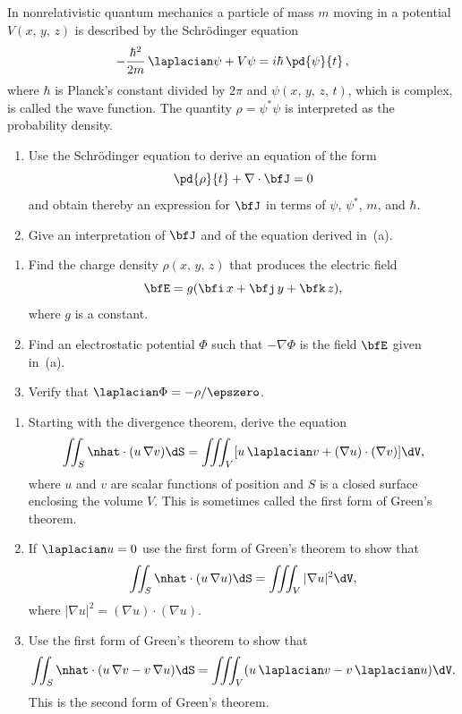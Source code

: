 \begin{problems}
\prob
In nonrelativistic quantum mechanics a particle of mass $m$ moving
in a potential $V(x,\,y,\,z)$ is described by the Schr\"odinger
equation
\[
-\frac{\hbar^2}{2m}\,\laplacian\psi + V\psi
= i\hbar\,\pd{\psi}{t}\,,
\]
where $\hbar$ is Planck's constant divided by $2\pi$ and
$\psi(x,\,y,\,z,\,t)$, which is complex, is called the wave function.
The quantity $\rho = \psi^*\psi$ is interpreted as the probability
density.
\begin{enumerate}[label=(\alph*)]
\item Use the Schr\"odinger equation to derive an equation of the form
  \[
  \pd{\rho}{t} + \nabla\cdot\bfJ = 0
  \]
  and obtain thereby an expression for $\bfJ$ in terms of $\psi$,
  $\psi^*$, $m$, and $\hbar$.

\item Give an interpretation of $\bfJ$ and of the equation derived
  in~(a).
\end{enumerate}

\prob
\begin{enumerate}[label=(\alph*)]
\item Find the charge density $\rho(x,\,y,\,z)$ that produces the
  electric field
  \[
  \bfE = g(\bfi\,x + \bfj\,y + \bfk\,z),
  \]
  where $g$ is a constant.

\item Find an electrostatic potential $\Phi$ such that
  $-\nabla\Phi$ is the field $\bfE$ given in~(a).

\item Verify that $\laplacian\Phi = -\rho/\epszero$.
\end{enumerate}

\prob
\begin{enumerate}[label=(\alph*)]
\item Starting with the divergence theorem, derive the equation
  \[
  \iint_S \nhat\cdot(u\,\nabla v)\dS
  = \iiint_V [u\,\laplacian v + (\nabla u)\cdot(\nabla v)]\dV,
  \]
  where $u$ and $v$ are scalar functions of position and $S$ is a
  closed surface enclosing the volume $V$.  This is sometimes called
  the first form of Green's theorem.

\item If $\laplacian u = 0$ use the first form of Green's theorem to
  show that
  \[
  \iint_S \nhat\cdot(u\,\nabla u)\dS = \iiint_V |\nabla u|^2\dV,
  \]
  where $|\nabla u|^2 = (\nabla u)\cdot(\nabla u)$.

\item Use the first form of Green's theorem to show that
  \[
  \iint_S \nhat\cdot(u\,\nabla v - v\,\nabla u)\dS
  = \iiint_V (u\,\laplacian v - v\,\laplacian u)\dV.
  \]
  This is the second form of Green's theorem.
\end{enumerate}


\end{problems}
